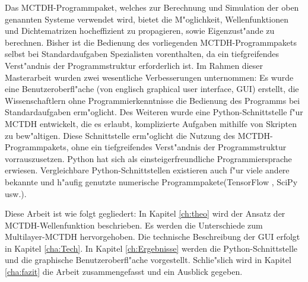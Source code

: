 Das MCTDH-Programmpaket, welches zur Berechnung und Simulation der oben ge\-nann\-ten Systeme verwendet wird, bietet die M"oglichkeit,
Wellenfunktionen und Dichte\-matrizen hocheffizient zu propagieren, sowie Eigenzust"ande zu berechnen.
Bisher ist die Bedienung des vorliegenden MCTDH-Programmpakets selbst bei Standardaufgaben Spezialisten vorenthalten, da
ein tiefgreifendes Verst"andnis der Programmstruktur erforderlich ist. 
Im Rahmen dieser Masterarbeit wurden zwei wesentliche Verbesserungen unternommen: 
Es wurde eine Benutzeroberfl"ache (von englisch graphical user interface, GUI) erstellt, die Wissenschaftlern
ohne Programmierkenntnisse die Bedienung des Programms bei Standardaufgaben erm"oglicht.
Des Weiteren wurde eine Python-Schnittstelle f"ur MCTDH entwickelt,
die es erlaubt, komplizierte Aufgaben mithilfe von Skripten zu bew"altigen.
Diese Schnittstelle erm"oglicht die Nutzung des MCTDH-Programmpakets, ohne 
ein tiefgreifendes Verst"andnis der Programmstruktur vorrauszusetzen.
Python hat sich als einsteigerfreundliche Programmiersprache erwiesen. Vergleichbare Python-Schnitt\-stellen existieren auch f"ur viele andere bekannte und h"aufig genutzte 
numerische Programmpakete(TensorFlow \cite{TensorFlow}, SciPy \cite{SciPy} usw.).

Diese Arbeit ist wie folgt gegliedert: In Kapitel \ref{ch:theo} wird der Ansatz der MCTDH-Wellenfunk\-tion beschrieben. 
Es werden die Unterschiede zum Multilayer-MCTDH hervorgehoben. 
Die technische Beschreibung der GUI erfolgt in Kapitel \ref{cha:Tech}.
In Kapitel \ref{ch:Ergebnisse} werden die Python-Schnittstelle und die graphische Benutzeroberfl"ache vorgestellt.     
Schlie"slich wird in Kapitel \ref{cha:fazit} die Arbeit zusammengefasst und ein Ausblick gegeben.     